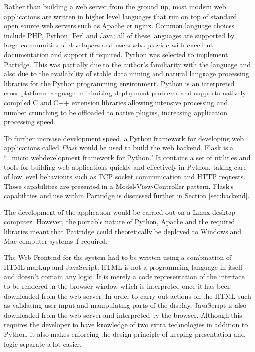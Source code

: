 Rather than building a web server from the ground up, most modern web
applications are written in higher level languages that run on top of standard,
open source web servers such as Apache or nginx. Common language choices
include PHP, Python, Perl and Java; all of these languages are supported by
large communities of developers and users who provide with excellent
documentation and support if required.  Python was selected to implement
Partidge. This was partially due to the author's familiarity with the language
and also due to the availability of stable data mining\cite{curk05} and natural
language processing\cite{bird2009natural} libraries for the Python programming
environment. Python is an interpreted cross-platform language, minimising
deployment problems and supports natively-compiled C and C++ extension
libraries allowing intensive processing  and number crunching to be offloaded
to native plugins, increasing application processing speed.

To further increase development speed, a Python framework for developing web
applications called \emph{Flask} would be used to build the web backend. Flask
is a ``...micro webdevelopment framework for Python.\cite{flask2012}" It
contains a set of utilities and tools for building web applications quickly and
effectively in Python, taking care of low level behaviours such as TCP socket
communication and HTTP requests. These capabilities are presented in a
Model-View-Controller pattern. Flask's capabilities and use within Partridge is
discussed further in Section \ref{sec:backend}.

The development of the application would be carried out on a Linux desktop
computer. However, the portable nature of Python, Apache and the required
libraries meant that Partridge could theoretically be deployed to Windows and
Mac computer systems if required.

The Web Frontend for the system had to be written using a combination of HTML
markup and JavaScript. HTML is not a programming language in itself and doesn't
contain any logic. It is merely a code representation of the interface to be
rendered in the browser window which is interpreted once it has been downloaded
from the web server. In order to carry out actions on the HTML such as
validating user input and manipulating parts of the display, JavaScript is also
downloaded from the web server and interpreted by the browser. Although this
requires the developer to have knowledge of two extra technologies in addition
to Python, it also makes enforcing the design principle of keeping presentation
and logic separate a lot easier.

